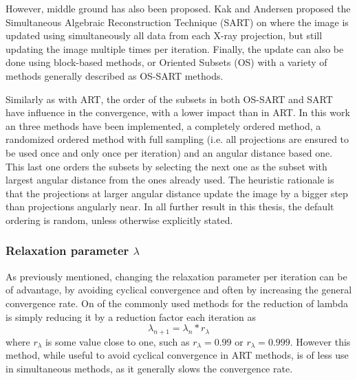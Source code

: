 However, middle ground has also been proposed. Kak and Andersen proposed\cite{SART} the Simultaneous Algebraic Reconstruction Technique (SART) on where the image is updated using simultaneously all data from each X-ray projection, but still updating the image multiple times per iteration. Finally, the update can also be done using block-based methods, or Oriented Subsets (OS) with a variety of methods generally described as OS-SART\cite{OS_SART} methods.

 Similarly as with ART, the order of the subsets in both OS-SART and SART have influence in the convergence, with a lower impact than in ART. In this work an three methods have been implemented, a completely ordered method, a randomized ordered method with full sampling (i.e. all projections are ensured to be used once and only once per iteration) and an angular distance based one. This last one orders the subsets by selecting the next one as the subset with largest angular distance from the ones already used. The heuristic rationale is that the projections at larger angular distance update the image by a bigger step than projections angularly near. In all further result in this thesis, the default ordering is random, unless otherwise explicitly stated.
 



\subsubsection{Relaxation parameter $\lambda$}

As previously mentioned, changing the relaxation parameter per iteration can be of advantage, by avoiding cyclical convergence and often by increasing the general convergence rate. On of the commonly used methods for the reduction of lambda is simply reducing it by a reduction factor each iteration as
\begin{equation}
\lambda_{n+1}=\lambda_n*r_\lambda
\end{equation}
where $r_\lambda$ is some value close to one, such as $r_\lambda=0.99$ or $r_\lambda=0.999$. However this method, while useful to avoid cyclical convergence in ART methods, is of less use in simultaneous methods, as it generally slows the convergence rate.%

